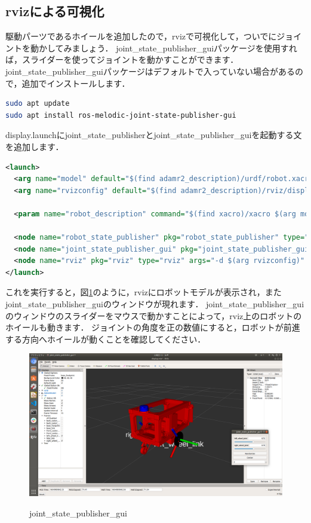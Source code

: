 \documentclass[{../../master}]{subfiles}
\begin{document}
\subsection{\textsf{rviz}による可視化}

駆動パーツであるホイールを追加したので，\textsf{rviz}で可視化して，ついでにジョイントを動かしてみましょう．
\textsf{joint\_state\_publisher\_gui}パッケージを使用すれば，スライダーを使ってジョイントを動かすことができます．
\textsf{joint\_state\_publisher\_gui}パッケージはデフォルトで入っていない場合があるので，追加でインストールします．

\begin{lstlisting}[language=sh, caption=Install \textsf{joint\_state\_publisher\_gui}]
sudo apt update
sudo apt install ros-melodic-joint-state-publisher-gui
\end{lstlisting}

\textsf{display.launch}に\textsf{joint\_state\_publisher}と\textsf{joint\_state\_publisher\_gui}を起動する文を追加します．

\begin{lstlisting}[language=XML, label=code:display_launch_add_joint_state_publisher_gui, caption=\textsf{display.launch}]
<launch>
  <arg name="model" default="$(find adamr2_description)/urdf/robot.xacro"/>
  <arg name="rvizconfig" default="$(find adamr2_description)/rviz/display.rviz" />

  <param name="robot_description" command="$(find xacro)/xacro $(arg model)" />

  <node name="robot_state_publisher" pkg="robot_state_publisher" type="robot_state_publisher"/>
  <node name="joint_state_publisher_gui" pkg="joint_state_publisher_gui" type="joint_state_publisher_gui"/>
  <node name="rviz" pkg="rviz" type="rviz" args="-d $(arg rvizconfig)" required="true"/>
</launch>
\end{lstlisting}

これを実行すると，図\ref{fig:rviz_joint_state_publisher_gui}のように，\textsf{rviz}にロボットモデルが表示され，また\textsf{joint\_state\_publisher\_gui}のウィンドウが現れます．
\textsf{joint\_state\_publisher\_gui}のウィンドウのスライダーをマウスで動かすことによって，\textsf{rviz}上のロボットのホイールも動きます．
ジョイントの角度を正の数値にすると，ロボットが前進する方向へホイールが動くことを確認してください．

\begin{figure}[ht]
  \centering
  \includegraphics[width=120truemm]{images/rviz_joint_state_publisher_gui.png}
  \label{fig:rviz_joint_state_publisher_gui}
  \caption{\textsf{joint\_state\_publisher\_gui}}
\end{figure}
\end{document}
